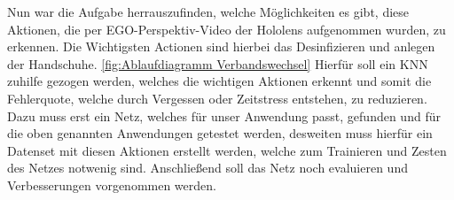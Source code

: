 Nun war die Aufgabe herrauszufinden, welche Möglichkeiten es gibt, diese Aktionen, die per EGO-Perspektiv-Video der Hololens aufgenommen wurden, zu erkennen. Die Wichtigsten Actionen sind hierbei das Desinfizieren und anlegen der Handschuhe. \ref{fig:Ablaufdiagramm Verbandswechsel}
Hierfür soll ein \acf{KNN} zuhilfe gezogen werden, welches die wichtigen Aktionen erkennt und somit die Fehlerquote, welche durch Vergessen oder Zeitstress entstehen, zu reduzieren. Dazu muss erst ein  Netz, welches für unser Anwendung passt, gefunden und für die oben genannten Anwendungen getestet werden, desweiten muss hierfür ein Datenset mit diesen Aktionen erstellt werden, welche zum Trainieren und Zesten des Netzes notwenig sind. Anschließend soll das Netz noch evaluieren und Verbesserungen vorgenommen werden.